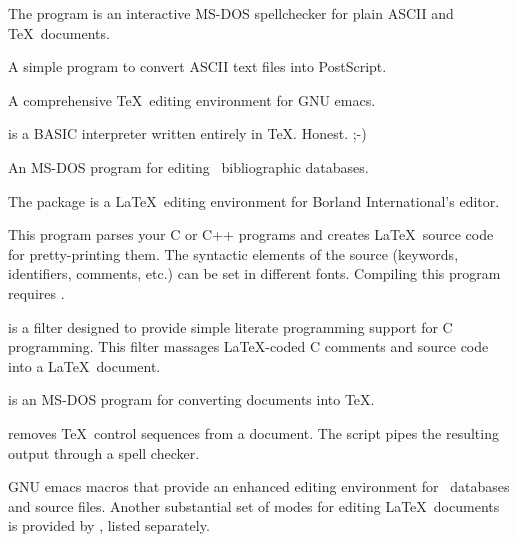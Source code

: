 
The  program is an interactive MS-DOS spellchecker
for plain ASCII and \TeX\ documents.  


A simple program to convert ASCII text files into PostScript.


A comprehensive \TeX\ editing environment for GNU emacs.

\newpage
{}

 is a BASIC interpreter written entirely in \TeX.
Honest. ;-)


An MS-DOS program for editing \BibTeX\ bibliographic databases.


The  package is a \LaTeX\ editing environment for
Borland International's  editor.


This program parses your C or C++ programs and creates \LaTeX\ source
code for pretty-printing them.  The syntactic elements of the source
(keywords, identifiers, comments, etc.) can be set in different fonts.
Compiling this program requires .


 is a filter designed to provide simple literate programming
support for C programming.  This filter massages \LaTeX-coded C comments 
and source code into a \LaTeX\ document.


 is an MS-DOS program for converting 
documents into \TeX.


 removes \TeX\ control sequences from a document.  The
 script pipes the resulting output through a spell
checker.  


GNU emacs macros that provide an enhanced editing environment for
\BibTeX\ databases and  source files.  Another substantial
set of modes for editing \LaTeX\ documents is provided by \auctex,
listed separately.

